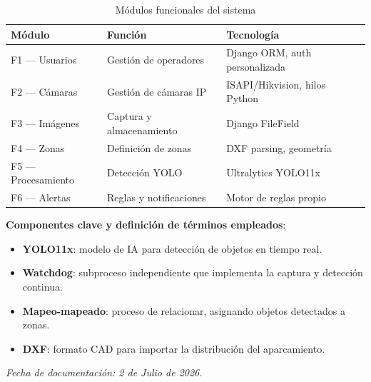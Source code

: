 \documentclass[12pt,a4paper]{article}
\begin{document}
\begin{table}[!h]
	\centering
	\begin{tabular}{lll}
		\toprule
		\textbf{Módulo} & \textbf{Función} & \textbf{Tecnología} \\
		\midrule
		F1 --- Usuarios & Gestión de operadores & Django ORM, auth personalizada \\
		F2 --- Cámaras & Gestión de cámaras IP & ISAPI/Hikvision, hilos Python \\
		F3 --- Imágenes & Captura y almacenamiento & Django FileField \\
		F4 --- Zonas & Definición de zonas & DXF parsing, geometría \\
		F5 --- Procesamiento & Detección YOLO & Ultralytics YOLO11x \\
		F6 --- Alertas & Reglas y notificaciones & Motor de reglas propio \\
		\bottomrule
	\end{tabular}
	\caption{Módulos funcionales del sistema}
	\label{tab:modulos}
\end{table}

\textbf{Componentes clave y definición de términos empleados}:

\begin{itemize}
	\item \textbf{YOLO11x}: modelo de IA para detección de objetos en tiempo real.
	\item \textbf{Watchdog}: subproceso independiente que implementa la captura y detección continua.
	\item \textbf{Mapeo-mapeado}: proceso de relacionar, asignando objetos detectados a zonas.
	\item \textbf{DXF}: formato CAD para importar la distribución del aparcamiento.
\end{itemize}

\vfill

\noindent\textit{Fecha de documentación: 2 de Julio de 2026.}
\end{document}
